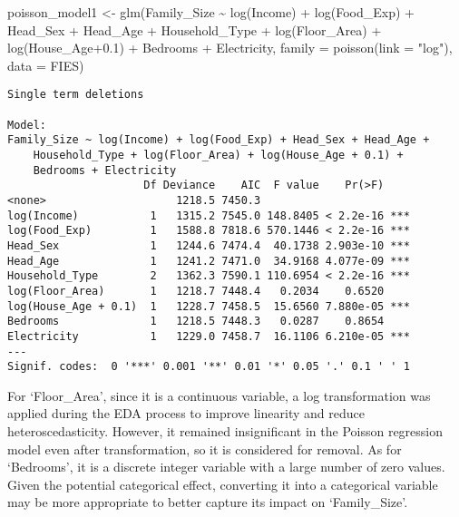 \documentclass[
]{article}
\newenvironment{Shaded}{\begin{snugshade}}{\end{snugshade}}
\newcommand{\AttributeTok}[1]{\textcolor[rgb]{0.40,0.45,0.13}{#1}}
\newcommand{\FloatTok}[1]{\textcolor[rgb]{0.68,0.00,0.00}{#1}}
\newcommand{\FunctionTok}[1]{\textcolor[rgb]{0.28,0.35,0.67}{#1}}
\newcommand{\NormalTok}[1]{\textcolor[rgb]{0.00,0.23,0.31}{#1}}
\newcommand{\OtherTok}[1]{\textcolor[rgb]{0.00,0.23,0.31}{#1}}
\newcommand{\SpecialCharTok}[1]{\textcolor[rgb]{0.37,0.37,0.37}{#1}}
\newcommand{\StringTok}[1]{\textcolor[rgb]{0.13,0.47,0.30}{#1}}
\begin{document}
\begin{Shaded}
\begin{Highlighting}[]
\NormalTok{poisson\_model1 }\OtherTok{\textless{}{-}} \FunctionTok{glm}\NormalTok{(Family\_Size }\SpecialCharTok{\textasciitilde{}} 
                       \FunctionTok{log}\NormalTok{(Income) }\SpecialCharTok{+}
                       \FunctionTok{log}\NormalTok{(Food\_Exp) }\SpecialCharTok{+}
\NormalTok{                       Head\_Sex }\SpecialCharTok{+}
\NormalTok{                       Head\_Age }\SpecialCharTok{+} 
\NormalTok{                       Household\_Type }\SpecialCharTok{+}
                       \FunctionTok{log}\NormalTok{(Floor\_Area) }\SpecialCharTok{+}
                       \FunctionTok{log}\NormalTok{(House\_Age}\FloatTok{+0.1}\NormalTok{) }\SpecialCharTok{+}
\NormalTok{                       Bedrooms }\SpecialCharTok{+}
\NormalTok{                       Electricity, }
                     \AttributeTok{family =} \FunctionTok{poisson}\NormalTok{(}\AttributeTok{link =} \StringTok{"log"}\NormalTok{),}
                     \AttributeTok{data =}\NormalTok{ FIES)}
\end{Highlighting}
\end{Shaded}

\begin{verbatim}
Single term deletions

Model:
Family_Size ~ log(Income) + log(Food_Exp) + Head_Sex + Head_Age + 
    Household_Type + log(Floor_Area) + log(House_Age + 0.1) + 
    Bedrooms + Electricity
                     Df Deviance    AIC  F value    Pr(>F)    
<none>                    1218.5 7450.3                       
log(Income)           1   1315.2 7545.0 148.8405 < 2.2e-16 ***
log(Food_Exp)         1   1588.8 7818.6 570.1446 < 2.2e-16 ***
Head_Sex              1   1244.6 7474.4  40.1738 2.903e-10 ***
Head_Age              1   1241.2 7471.0  34.9168 4.077e-09 ***
Household_Type        2   1362.3 7590.1 110.6954 < 2.2e-16 ***
log(Floor_Area)       1   1218.7 7448.4   0.2034    0.6520    
log(House_Age + 0.1)  1   1228.7 7458.5  15.6560 7.880e-05 ***
Bedrooms              1   1218.5 7448.3   0.0287    0.8654    
Electricity           1   1229.0 7458.7  16.1106 6.210e-05 ***
---
Signif. codes:  0 '***' 0.001 '**' 0.01 '*' 0.05 '.' 0.1 ' ' 1
\end{verbatim}

For `Floor\_Area', since it is a continuous variable, a log
transformation was applied during the EDA process to improve linearity
and reduce heteroscedasticity. However, it remained insignificant in the
Poisson regression model even after transformation, so it is considered
for removal. As for `Bedrooms', it is a discrete integer variable with a
large number of zero values. Given the potential categorical effect,
converting it into a categorical variable may be more appropriate to
better capture its impact on `Family\_Size'.
\end{document}
